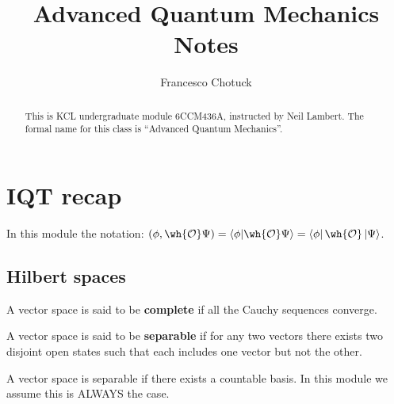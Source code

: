 \documentclass[12pt, a4paper]{article}
\title{Advanced Quantum Mechanics Notes}
\date{}
\author{Francesco Chotuck}
\newcommand{\operator}{\wh{\mathcal{O}}}
\begin{document}
\maketitle

\begin{abstract}
    \noindent This is KCL undergraduate module 6CCM436A, instructed by Neil Lambert. The formal name for this class is ``Advanced Quantum Mechanics''.
\end{abstract}

\tableofcontents

\pagebreak

\section{IQT recap}

\begin{mdremark}
    In this module the notation: \((\phi,\operator \Psi) = \bra{\phi} \ket{\operator\Psi}= \bra{\phi} \operator \ket{\Psi}\).
\end{mdremark}


\subsection{Hilbert spaces}

\begin{definition}
    A vector space is said to be \textbf{complete} if all the Cauchy sequences converge.
\end{definition}

\begin{definition}
    A vector space is said to be \textbf{separable} if for any two vectors there exists two disjoint open states such that each includes one vector but not the other.
\end{definition}

\begin{mdthm}
    A vector space is separable if there exists a countable basis. In this module we assume this is ALWAYS the case.
\end{mdthm}
\end{document}
